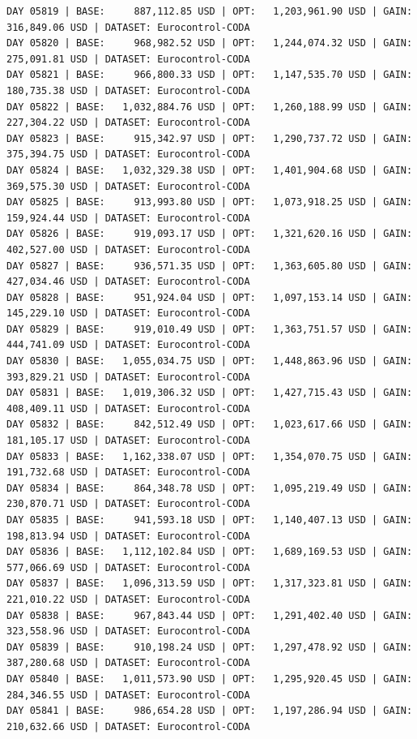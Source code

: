 \documentclass[11pt,a4paper]{article}
\begin{document}
\begin{verbatim}
DAY 05819 | BASE:     887,112.85 USD | OPT:   1,203,961.90 USD | GAIN: 316,849.06 USD | DATASET: Eurocontrol-CODA
DAY 05820 | BASE:     968,982.52 USD | OPT:   1,244,074.32 USD | GAIN: 275,091.81 USD | DATASET: Eurocontrol-CODA
DAY 05821 | BASE:     966,800.33 USD | OPT:   1,147,535.70 USD | GAIN: 180,735.38 USD | DATASET: Eurocontrol-CODA
DAY 05822 | BASE:   1,032,884.76 USD | OPT:   1,260,188.99 USD | GAIN: 227,304.22 USD | DATASET: Eurocontrol-CODA
DAY 05823 | BASE:     915,342.97 USD | OPT:   1,290,737.72 USD | GAIN: 375,394.75 USD | DATASET: Eurocontrol-CODA
DAY 05824 | BASE:   1,032,329.38 USD | OPT:   1,401,904.68 USD | GAIN: 369,575.30 USD | DATASET: Eurocontrol-CODA
DAY 05825 | BASE:     913,993.80 USD | OPT:   1,073,918.25 USD | GAIN: 159,924.44 USD | DATASET: Eurocontrol-CODA
DAY 05826 | BASE:     919,093.17 USD | OPT:   1,321,620.16 USD | GAIN: 402,527.00 USD | DATASET: Eurocontrol-CODA
DAY 05827 | BASE:     936,571.35 USD | OPT:   1,363,605.80 USD | GAIN: 427,034.46 USD | DATASET: Eurocontrol-CODA
DAY 05828 | BASE:     951,924.04 USD | OPT:   1,097,153.14 USD | GAIN: 145,229.10 USD | DATASET: Eurocontrol-CODA
DAY 05829 | BASE:     919,010.49 USD | OPT:   1,363,751.57 USD | GAIN: 444,741.09 USD | DATASET: Eurocontrol-CODA
DAY 05830 | BASE:   1,055,034.75 USD | OPT:   1,448,863.96 USD | GAIN: 393,829.21 USD | DATASET: Eurocontrol-CODA
DAY 05831 | BASE:   1,019,306.32 USD | OPT:   1,427,715.43 USD | GAIN: 408,409.11 USD | DATASET: Eurocontrol-CODA
DAY 05832 | BASE:     842,512.49 USD | OPT:   1,023,617.66 USD | GAIN: 181,105.17 USD | DATASET: Eurocontrol-CODA
DAY 05833 | BASE:   1,162,338.07 USD | OPT:   1,354,070.75 USD | GAIN: 191,732.68 USD | DATASET: Eurocontrol-CODA
DAY 05834 | BASE:     864,348.78 USD | OPT:   1,095,219.49 USD | GAIN: 230,870.71 USD | DATASET: Eurocontrol-CODA
DAY 05835 | BASE:     941,593.18 USD | OPT:   1,140,407.13 USD | GAIN: 198,813.94 USD | DATASET: Eurocontrol-CODA
DAY 05836 | BASE:   1,112,102.84 USD | OPT:   1,689,169.53 USD | GAIN: 577,066.69 USD | DATASET: Eurocontrol-CODA
DAY 05837 | BASE:   1,096,313.59 USD | OPT:   1,317,323.81 USD | GAIN: 221,010.22 USD | DATASET: Eurocontrol-CODA
DAY 05838 | BASE:     967,843.44 USD | OPT:   1,291,402.40 USD | GAIN: 323,558.96 USD | DATASET: Eurocontrol-CODA
DAY 05839 | BASE:     910,198.24 USD | OPT:   1,297,478.92 USD | GAIN: 387,280.68 USD | DATASET: Eurocontrol-CODA
DAY 05840 | BASE:   1,011,573.90 USD | OPT:   1,295,920.45 USD | GAIN: 284,346.55 USD | DATASET: Eurocontrol-CODA
DAY 05841 | BASE:     986,654.28 USD | OPT:   1,197,286.94 USD | GAIN: 210,632.66 USD | DATASET: Eurocontrol-CODA

\end{verbatim}
\end{document}
